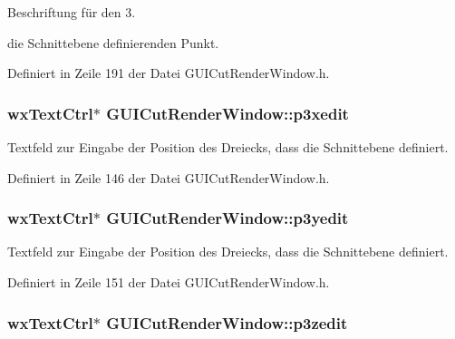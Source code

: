 Beschriftung für den 3. 

die Schnittebene definierenden Punkt. 

Definiert in Zeile 191 der Datei G\-U\-I\-Cut\-Render\-Window.\-h.

\hypertarget{classGUICutRenderWindow_a3382e7bd629988774c4f5e81bf66ca7e}{
\subsubsection[{p3xedit}]{\setlength{\rightskip}{0pt plus 5cm}wx\-Text\-Ctrl$\ast$ G\-U\-I\-Cut\-Render\-Window\-::p3xedit\hspace{0.3cm}{\ttfamily [private]}}}\label{classGUICutRenderWindow_a3382e7bd629988774c4f5e81bf66ca7e}


Textfeld zur Eingabe der Position des Dreiecks, dass die Schnittebene definiert. 



Definiert in Zeile 146 der Datei G\-U\-I\-Cut\-Render\-Window.\-h.

\hypertarget{classGUICutRenderWindow_a5f908b41a4d9db847cd89c0a3c52b61a}{
\subsubsection[{p3yedit}]{\setlength{\rightskip}{0pt plus 5cm}wx\-Text\-Ctrl$\ast$ G\-U\-I\-Cut\-Render\-Window\-::p3yedit\hspace{0.3cm}{\ttfamily [private]}}}\label{classGUICutRenderWindow_a5f908b41a4d9db847cd89c0a3c52b61a}


Textfeld zur Eingabe der Position des Dreiecks, dass die Schnittebene definiert. 



Definiert in Zeile 151 der Datei G\-U\-I\-Cut\-Render\-Window.\-h.

\hypertarget{classGUICutRenderWindow_ac4c2f8825a9596f32093f0ac08a7848d}{
\subsubsection[{p3zedit}]{\setlength{\rightskip}{0pt plus 5cm}wx\-Text\-Ctrl$\ast$ G\-U\-I\-Cut\-Render\-Window\-::p3zedit\hspace{0.3cm}{\ttfamily [private]}}}\label{classGUICutRenderWindow_ac4c2f8825a9596f32093f0ac08a7848d}


